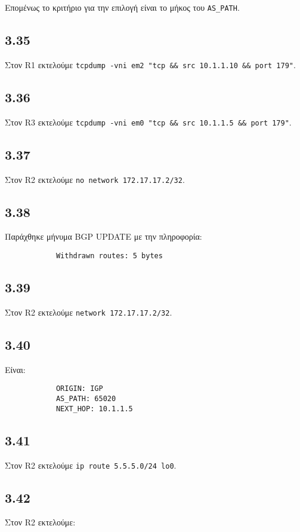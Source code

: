 \documentclass[a4paper, 12pt]{article}
\begin{document}
		Επομένως το κριτήριο για την επιλογή είναι το μήκος του \verb|AS_PATH|.
		 
	\subsection*{3.35}
		Στον R1 εκτελούμε \verb|tcpdump -vni em2 "tcp && src 10.1.1.10 && port 179"|.

	\subsection*{3.36}
		Στον R3 εκτελούμε \verb|tcpdump -vni em0 "tcp && src 10.1.1.5 && port 179"|.

	\subsection*{3.37}
		Στον R2 εκτελούμε \verb|no network 172.17.17.2/32|.

	\subsection*{3.38}
		Παράχθηκε μήνυμα BGP UPDATE με την πληροφορία:
		
		\begin{verbatim}
			Withdrawn routes: 5 bytes
		\end{verbatim}

	\subsection*{3.39}
		Στον R2 εκτελούμε \verb|network 172.17.17.2/32|.

	\subsection*{3.40}
		Είναι:
		
		\begin{verbatim}
			ORIGIN: IGP
			AS_PATH: 65020
			NEXT_HOP: 10.1.1.5
		\end{verbatim}

	\subsection*{3.41}
		Στον R2 εκτελούμε \verb|ip route 5.5.5.0/24 lo0|.

	\subsection*{3.42}
		Στον R2 εκτελούμε:
		
\end{document}
